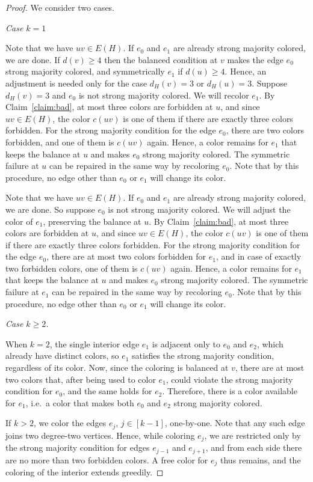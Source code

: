 \documentclass[11pt]{article}
\theoremstyle{definition}
\begin{document}
\begin{proof}
We consider two cases.

\smallskip
\emph{Case $k=1$}
\smallskip

Note that we have $uv\in E(H)$. If $e_0$ and $e_1$ are already strong majority colored, we are done. If $d(v)\ge 4$ then the balanced condition at $v$ makes the edge $e_0$ strong majority colored, and symmetrically $e_1$ if $d(u)\ge 4$. Hence, an adjustment is needed only for the case $d_H(v)=3$ or $d_H(u)=3$. Suppose $d_H(v)=3$ and $e_0$ is not strong majority colored. We will recolor $e_1$. By Claim~\ref{claim:bad}, at most three colors are forbidden at $u$, and since $uv\in E(H)$, the color $c(uv)$ is one of them if there are exactly three colors forbidden. For the strong majority condition for the edge $e_0$, there are two colors forbidden, and one of them is $c(uv)$ again. Hence, a color remains for $e_1$ that keeps the balance at $u$ and makes $e_0$ strong majority colored. The symmetric failure at $u$ can be repaired in the same way by recoloring $e_0$. Note that by this procedure, no edge other than $e_0$ or $e_1$ will change its color.

Note that we have $uv\in E(H)$. If $e_0$ and $e_1$ are already strong majority colored, we are done. So suppose $e_0$ is not strong majority colored. We will adjust the color of $e_1$, preserving the balance at $u$. By Claim~\ref{claim:bad}, at most three colors are forbidden at $u$, and since $uv\in E(H)$, the color $c(uv)$ is one of them if there are exactly three colors forbidden. For the strong majority condition for the edge $e_0$, there are at most two colors forbidden for $e_1$, and in case of exactly two forbidden colors, one of them is $c(uv)$ again. Hence, a color remains for $e_1$ that keeps the balance at $u$ and makes $e_0$ strong majority colored. The symmetric failure at $e_1$ can be repaired in the same way by recoloring $e_0$. Note that by this procedure, no edge other than $e_0$ or $e_1$ will change its color.

\smallskip
\emph{Case $k\ge 2$.}
\smallskip

When $k=2$, the single interior edge $e_1$ is adjacent only to $e_0$ and $e_2$, which already have distinct colors, so $e_1$ satisfies the strong majority condition, regardless of its color. Now, since the coloring is balanced at $v$, there are at most two colors that, after being used to color $e_1$, could violate the strong majority condition for $e_0$, and the same holds for $e_2$. Therefore, there is a color available for $e_1$, i.e.~a color that makes both $e_0$ and $e_2$ strong majority colored. 

If $k>2$, we color the edges $e_j$, $j\in[k-1]$, one-by-one. Note that any such edge joins two degree-two vertices. Hence, while coloring $e_j$, we are restricted only by the strong majority condition for edges $e_{j-1}$ and $e_{j+1}$, and from each side there are no more than two forbidden colors. A free color for $e_j$ thus remains, and the coloring of the interior extends greedily. 
\end{proof}
\end{document}
